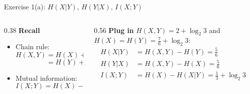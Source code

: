 \documentclass[aspectratio=169]{beamer}
\newcommand{\etpx}{H(X)}
\newcommand{\etpy}{H(Y)}
\newcommand{\etpxy}{H(X, Y)}
\newcommand{\etpycx}{H(Y|X)}
\newcommand{\etpxcy}{H(X|Y)}
\newcommand{\mixy}{I(X; Y)}
\begin{document}
\begin{frame}{Exercise 1(a): $H(X|Y),\, H(Y|X),\, I(X;Y)$}
\setlength{\abovedisplayskip}{3pt}
\setlength{\belowdisplayskip}{3pt}

\begin{columns}[T,totalwidth=\textwidth]
	\begin{column}{0.38\textwidth}
		\small
		\textbf{Recall}
		\begin{itemize}
			\setlength{\itemsep}{4pt}
			\item Chain rule:
			\[
				\etpxy = \etpx + \etpycx
			\]
			\[
				\phantom{\etpxy} = \etpy + \etpxcy
			\]
			\item Mutual information:
			\[
				\mixy = \etpx - \etpxcy
			\]
		\end{itemize}
	\end{column}
	\begin{column}{0.56\textwidth}
		\small
		\textbf{Plug in} $\etpxy=2+\log_2 3$ and $\etpx=\etpy=\tfrac{7}{6}+\log_2 3$:
		\vspace{2pt}
		\[
		\begin{aligned}
			\etpxcy &= \etpxy - \etpy = \tfrac{5}{6} \\[2pt]
			\etpycx &= \etpxy - \etpx = \tfrac{5}{6} \\[4pt]
			\mixy   &= \etpx - \etpxcy = \tfrac{1}{3} + \log_2 3
		\end{aligned}
		\]
	\end{column}
\end{columns}
\end{frame}
\end{document}
